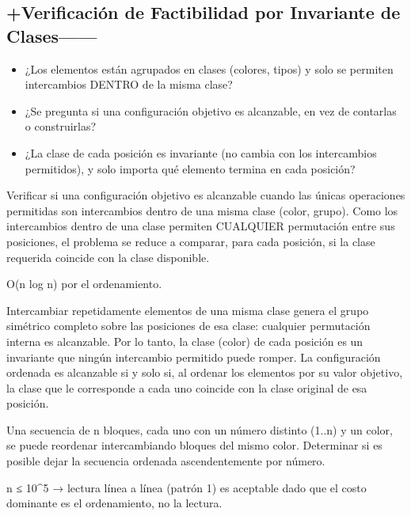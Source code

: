\subsection{+Verificación de Factibilidad por Invariante de Clases------}


\begin{itemize}
\item ¿Los elementos están agrupados en clases (colores, tipos) y solo se permiten intercambios DENTRO de la misma clase?
\item ¿Se pregunta si una configuración objetivo es alcanzable, en vez de contarlas o construirlas?
\item ¿La clase de cada posición es invariante (no cambia con los intercambios permitidos), y solo importa qué elemento termina en cada posición?
\end{itemize}

 Verificar si una configuración objetivo es alcanzable cuando las únicas operaciones permitidas son intercambios dentro de una misma clase (color, grupo). Como los intercambios dentro de una clase permiten CUALQUIER permutación entre sus posiciones, el problema se reduce a comparar, para cada posición, si la clase requerida coincide con la clase disponible.

 O(n log n) por el ordenamiento.

 Intercambiar repetidamente elementos de una misma clase genera el grupo simétrico completo sobre las posiciones de esa clase: cualquier permutación interna es alcanzable. Por lo tanto, la clase (color) de cada posición es un invariante que ningún intercambio permitido puede romper. La configuración ordenada es alcanzable si y solo si, al ordenar los elementos por su valor objetivo, la clase que le corresponde a cada uno coincide con la clase original de esa posición.


Una secuencia de n bloques, cada uno con un número distinto (1..n) y un color, se puede reordenar intercambiando bloques del mismo color. Determinar si es posible dejar la secuencia ordenada ascendentemente por número.

 n ≤ 10\textasciicircum{}5 → lectura línea a línea (patrón 1) es aceptable dado que el costo dominante es el ordenamiento, no la lectura.


